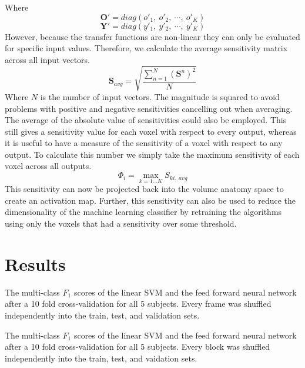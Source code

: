 \documentclass[twocolumn,final]{article}
\begin{document}
Where
\begin{equation}
\mathbf{O}' = diag(o'_{1},~o'_{2},~\cdots,~o'_{K})
\end{equation}
\begin{equation}
\mathbf{Y}' = diag(y'_{1},~y'_{2},~\cdots,~y'_{K})
\end{equation}
However, because the transfer functions are non-linear they can only be evaluated for specific input values.
Therefore, we calculate the average sensitivity matrix across all input vectors.
\begin{equation}
\mathbf{S}_{avg} = \sqrt{ \frac{ \sum_{n = 1}^{N}{ \left( \mathbf{S}^{n}\right)^{2} } }{N} }
\end{equation}
Where $N$ is the number of input vectors.
The magnitude is squared to avoid problems with positive and negative sensitivities cancelling out when averaging.
The average of the absolute value of sensitivities could also be employed.
This still gives a sensitivity value for each voxel with respect to every output, whereas it is useful to have a measure of the sensitivity of a voxel with respect to any output.
To calculate this number we simply take the maximum sensitivity of each voxel across all outputs.
\begin{equation}
\Phi_{i} = \max_{k=1 \dots K}{S_{ki,~avg}}
\end{equation}
This sensitivity can now be projected back into the volume anatomy space to create an activation map.
Further, this sensitivity can also be used to reduce the dimensionality of the machine learning classifier by retraining the algorithms using only the voxels that had a sensitivity over some threshold.
\section{Results}

\begin{table}[!htbp]
\centering

\caption{
The multi-class $F_1$ scores of the linear SVM and the feed forward neural network after a 10 fold cross-validation for all 5 subjects. 
Every frame was shuffled independently into the train, test, and validation sets.}
\label{tab:frame-shuffle}
\end{table}

\begin{table}[!htbp]
\centering

\caption{
The multi-class $F_1$ scores of the linear SVM and the feed forward neural network after a 10 fold cross-validation for all 5 subjects. 
Every block was shuffled independently into the train, test, and vaidation sets.}
\label{tab:block-shuffle}
\end{table}
\end{document}
